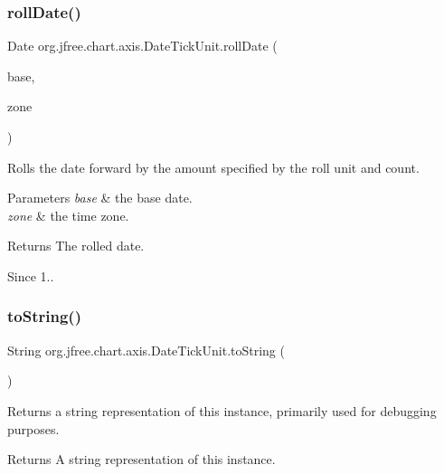\subsubsection{\texorpdfstring{roll\+Date()}{rollDate()}\hspace{0.1cm}{\footnotesize\ttfamily [2/2]}}
{\footnotesize\ttfamily Date org.\+jfree.\+chart.\+axis.\+Date\+Tick\+Unit.\+roll\+Date (\begin{DoxyParamCaption}\item[{Date}]{base,  }\item[{Time\+Zone}]{zone }\end{DoxyParamCaption})}

Rolls the date forward by the amount specified by the roll unit and count.


\begin{DoxyParams}{Parameters}
{\em base} & the base date. \\
\hline
{\em zone} & the time zone.\\
\hline
\end{DoxyParams}
\begin{DoxyReturn}{Returns}
The rolled date.
\end{DoxyReturn}
\begin{DoxySince}{Since}
1.. 
\end{DoxySince}
\mbox{\label{classorg_1_1jfree_1_1chart_1_1axis_1_1_date_tick_unit_ae50d77936e2d1e6f3c1b8ee6d8763957}} 
\subsubsection{\texorpdfstring{to\+String()}{toString()}}
{\footnotesize\ttfamily String org.\+jfree.\+chart.\+axis.\+Date\+Tick\+Unit.\+to\+String (\begin{DoxyParamCaption}{ }\end{DoxyParamCaption})}

Returns a string representation of this instance, primarily used for debugging purposes.

\begin{DoxyReturn}{Returns}
A string representation of this instance. 
\end{DoxyReturn}
\mbox{\label{classorg_1_1jfree_1_1chart_1_1axis_1_1_date_tick_unit_aac7c51829f8ace61a2a9d4e72266bcf9}} 
